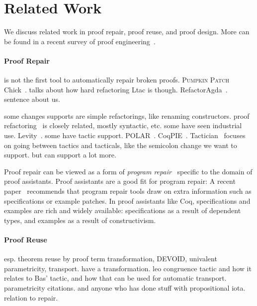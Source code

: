 \section{Related Work}


We discuss related work in proof repair, proof reuse, and proof design.
More can be found in a recent survey of proof engineering~\cite{PGL-045}.

\paragraph{Proof Repair}

\toolname is not the first tool to automatically repair broken proofs.
\textsc{Pumpkin Patch}~\cite{pumpkinpatch}
Chick~\cite{robert2018}.
talks about how hard refactoring Ltac is though.
RefactorAgda~\cite{wibergh2019}.
sentence about us.

some changes \toolname supports are simple refactorings, like renaming constructors.
proof refactoring~\cite{WhitesidePhD} is closely related, mostly syntactic, etc.
some have seen industrial use.
Levity~\cite{Bourke12}.
some have tactic support.
POLAR~\cite{Dietrich2013}.
CoqPIE~\cite{Roe2016}.
Tactician~\cite{adams2015} focuses on going between tactics and tacticals, like the semicolon change we want to support.
but \toolname can support a lot more.

Proof repair can be viewed as a form of \textit{program repair}~\cite{Monperrus:2018:ASR:3177787.3105906, Gazzola:2018:ASR:3180155.3182526}
specific to the domain of proof assistants.
Proof assistants are a good fit for program repair: A recent paper~\cite{Qi:2015:APP:2771783.2771791} 
recommends that program repair tools draw on extra information
such as specifications or example patches. In proof assistants like Coq, specifications and examples 
are rich and widely available: specifications as a result of dependent types,
and examples as a result of constructivism.

\paragraph{Proof Reuse}

esp. theorem reuse by proof term transformation, DEVOID, univalent parametricity, transport. \cite{magaud2000changing} have a transformation.
leo congruence tactic and how it relates to Bas' tactic, and how that can be used for automatic transport.
parametricity citations. and anyone who has done stuff with propositional iota.
relation to repair.

